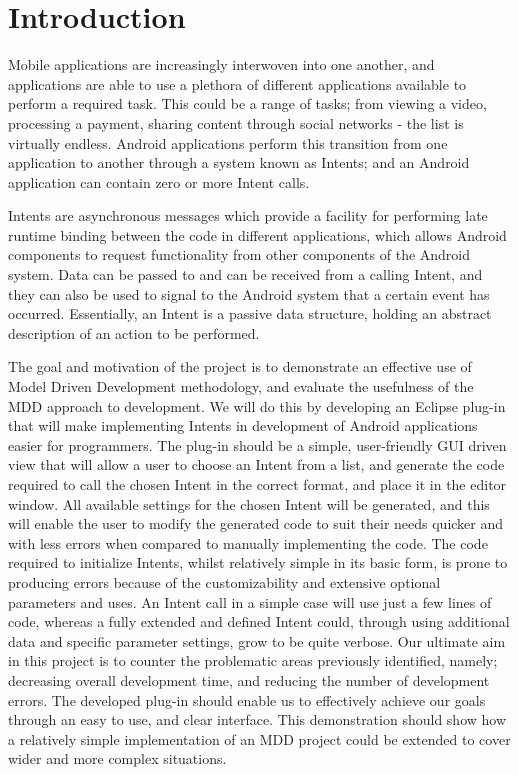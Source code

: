 \section{Introduction}

Mobile applications are increasingly interwoven into one another, and applications are able to use a plethora of different applications available to perform a required task. This could be a range of tasks; from viewing a video, processing a payment, sharing content through social networks - the list is virtually endless. Android applications perform this transition from one application to another through a system known as Intents; and an Android application can contain zero or more Intent calls.

Intents are asynchronous messages which provide a facility for performing late runtime binding between the code in different applications, which allows Android components to request functionality from other components of the Android system. Data can be passed to and can be received from a calling Intent, and they can also be used to signal to the Android system that a certain event has occurred. Essentially, an Intent is a passive data structure, holding an abstract description of an action to be performed. 

The goal and motivation of the project is to demonstrate an effective use of Model Driven Development methodology, and evaluate the usefulness of the MDD approach to development. We will do this by developing an Eclipse plug-in that will make implementing Intents in development of Android applications easier for programmers. The plug-in should be a simple, user-friendly GUI driven view that will allow a user to choose an Intent from a list, and generate the code required to call the chosen Intent in the correct format, and place it in the editor window. All available settings for the chosen Intent will be generated, and this will enable the user to modify the generated code to suit their needs quicker and with less errors when compared to manually implementing the code.
The code required to initialize Intents, whilst relatively simple in its basic form, is prone to producing errors because of the customizability and extensive optional parameters and uses. An Intent call in a simple case will use just a few lines of code, whereas a fully extended and defined Intent could, through using additional data and specific parameter settings, grow to be quite verbose. 
Our ultimate aim in this project is to counter the problematic areas previously identified, namely; decreasing overall development time, and reducing the number of development errors. The developed plug-in should enable us to effectively achieve our goals through an easy to use, and clear interface.
This demonstration should show how a relatively simple implementation of an MDD project could be extended to cover wider and more complex situations.

